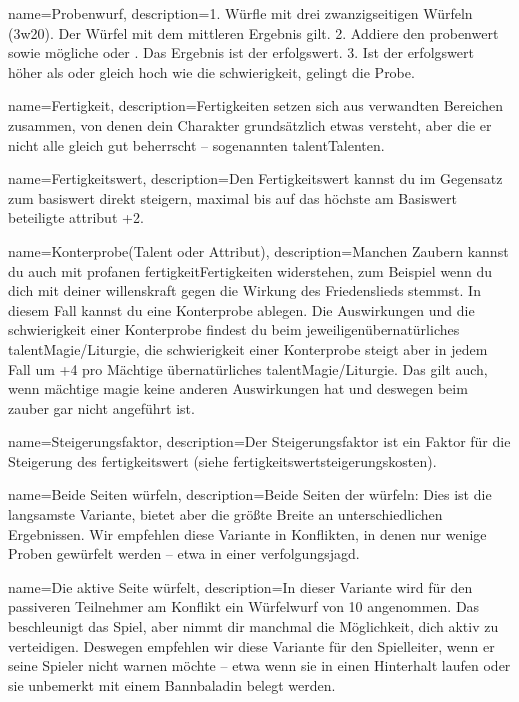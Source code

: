 {
    name={Probenwurf},
    description={1. Würfle mit drei zwanzigseitigen Würfeln (\gls{3w20}). Der
Würfel mit dem mittleren Ergebnis gilt. 2. Addiere den \gls{probenwert} sowie
mögliche  oder . Das
Ergebnis ist der \gls{erfolgswert}. 3. Ist der \gls{erfolgswert} höher als oder gleich hoch wie die
\gls{schwierigkeit}, gelingt die Probe.}}

{
    name={Fertigkeit},
    description={Fertigkeiten setzen sich aus verwandten Bereichen zusammen, von denen dein Charakter grundsätzlich etwas versteht, aber die er nicht alle gleich gut beherrscht – sogenannten \gls{talent}{Talenten}.}}

{
    name={Fertigkeitswert},
    description={Den Fertigkeitswert kannst du im Gegensatz zum \gls{basiswert} direkt steigern, maximal bis auf das höchste am Basiswert beteiligte \gls{attribut} +2.}}

{
    name={Konterprobe(Talent oder Attribut)},
    description={Manchen Zaubern kannst du auch mit profanen \gls{fertigkeit}{Fertigkeiten} widerstehen, zum Beispiel wenn du dich mit deiner \gls{willenskraft} gegen die Wirkung des Friedenslieds stemmst. In diesem Fall kannst du eine Konterprobe ablegen. Die Auswirkungen und die \gls{schwierigkeit} einer Konterprobe findest du beim jeweiligen\gls{übernatürliches talent}{Magie/Liturgie}, die \gls{schwierigkeit} einer Konterprobe steigt aber in jedem Fall um +4 pro Mächtige \gls{übernatürliches talent}{Magie/Liturgie}. Das gilt auch, wenn \gls{mächtige magie} keine anderen Auswirkungen hat und deswegen beim \gls{zauber} gar nicht angeführt ist.}}

{
    name={Steigerungsfaktor},
    description={Der Steigerungsfaktor ist ein Faktor für die Steigerung des \gls{fertigkeitswert} (siehe \gls{fertigkeitswertsteigerungskosten}).}}

{
    name={Beide Seiten würfeln},
    description={Beide Seiten der  würfeln: Dies ist die langsamste Variante, bietet aber die größte Breite an unterschiedlichen Ergebnissen. Wir empfehlen diese Variante in Konflikten, in denen nur wenige Proben gewürfelt werden – etwa in einer \gls{verfolgungsjagd}.}}

{
    name={Die aktive Seite würfelt},
    description={In dieser Variante wird für den passiveren Teilnehmer am Konflikt ein Würfelwurf von 10 angenommen. Das beschleunigt das Spiel, aber nimmt dir manchmal die Möglichkeit, dich aktiv zu verteidigen. Deswegen empfehlen wir diese Variante für den Spielleiter, wenn er seine Spieler nicht warnen möchte – etwa wenn sie in einen Hinterhalt laufen oder sie unbemerkt mit einem Bannbaladin belegt werden.}}

